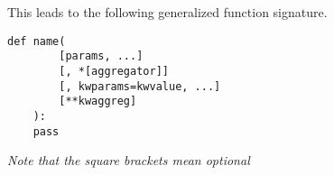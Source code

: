 \documentclass[ignorenonframetext,]{beamer}
\begin{document}
\begin{frame}[fragile]

This leads to the following generalized function signature.

\begin{verbatim}
def name(
        [params, ...]
        [, *[aggregator]]
        [, kwparams=kwvalue, ...]
        [**kwaggreg]
    ):
    pass
\end{verbatim}

\emph{Note that the square brackets mean optional}

\end{frame}
\end{document}
